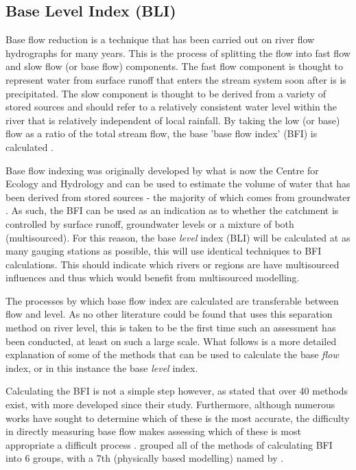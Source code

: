 \documentclass[DIV=calc, paper=a4, fontsize=11pt, twocolumn]{scrartcl}	 %
\begin{document}
	\subsection*{Base Level Index (BLI)}
Base flow reduction is a technique that has been carried out on river flow hydrographs for many years. This is the process of splitting the flow into fast flow and slow flow (or base flow) components. The fast flow component is thought to represent water from surface runoff that enters the stream system soon after is is precipitated. The slow component is thought to be derived from a variety of stored sources \citep{Tallaksen1995} and should refer to a relatively consistent water level within the river that is relatively independent of local rainfall. By taking the low (or base) flow as a ratio of the total stream flow, the base 'base flow index' (BFI) is calculated \citep{Gustard1992}.

Base flow indexing was originally developed by what is now the Centre for Ecology and Hydrology and can be used to estimate the volume of water that has been derived from stored sources - the majority of which comes from groundwater \citep{Li2013,Stewart2007}. As such, the BFI can be used as an indication as to whether the catchment is controlled by surface runoff, groundwater levels or a mixture of both (multisourced). For this reason, the base \textit{level} index (BLI) will be calculated at as many gauging stations as possible, this will use identical techniques to BFI calculations. This should indicate which rivers or regions are have multisourced  influences and thus which would benefit from multisourced modelling.

The processes by which base flow index are calculated are transferable between flow and level. As no other literature could be found that uses this separation method on river level, this is taken to be the first time such an assessment has been conducted, at least on such a large scale. What follows is a more detailed explanation of some of the methods that can be used to calculate the base \textit{flow} index, or in this instance the base \textit{level} index.

Calculating the BFI is not a simple step however, as \citet{Nejadhashemi2009} stated that over 40 methods exist, with more developed since their study. Furthermore, although numerous works have sought to determine which of these is the most accurate, the difficulty in directly measuring base flow makes assessing which of these is most appropriate a difficult process \citep{Li2013}. \citet{Nejadhashemi2009} grouped all of the methods of calculating BFI into 6 groups, with a 7th (physically based modelling) named by \citet{Li2013}.
\end{document}
